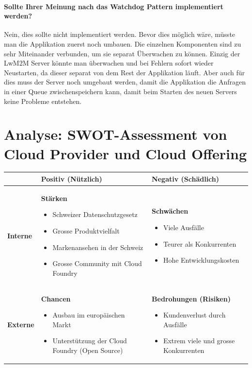 \subsubsection{Sollte Ihrer Meinung nach das Watchdog Pattern implementiert werden?}
Nein, dies sollte nicht implementiert werden. Bevor dies möglich wäre, müsste man die Applikation zuerst noch umbauen. Die einzelnen Komponenten sind zu sehr Miteinander verbunden, um sie separat Überwachen zu können. Einzig der LwM2M Server könnte man überwachen und bei Fehlern sofort wieder Neustarten, da dieser separat von dem Rest der Applikation läuft. Aber auch für dies muss der Server noch umgebaut werden, damit die Applikation die Anfragen in einer Queue zwischenspeichern kann, damit beim Starten des neuen Servers keine Probleme entstehen.
\chapter{Analyse: SWOT-Assessment von Cloud Provider und Cloud Offering}
\begin{table}[H]
\begin{tabular}{|l|p{}|p{}|}
\hline 
 & \textbf{Positiv (Nützlich)}  & \textbf{Negativ (Schädlich)} \\ \hline 
\textbf{Interne} & \textbf{Stärken} 
\begin{itemize}
\item Schweizer Datenschutzgesetz
\item Grosse Produktvielfalt
\item Markenansehen in der Schweiz
\item Grosse Community mit Cloud Foundry
\end{itemize}

& \textbf{Schwächen}
\begin{itemize}
\item Viele Ausfälle
\item Teurer als Konkurrenten
\item Hohe Entwicklungskosten
\end{itemize}
\\ \hline 
\textbf{Externe} & \textbf{Chancen} 
\begin{itemize}
\item Ausbau im europäischen Markt
\item Unterstützung der Cloud Foundry (Open Source)
\end{itemize}&
\textbf{Bedrohungen (Risiken)} 
 \begin{itemize}
\item Kundenverlust durch Ausfälle
\item Extrem viele und grosse Konkurrenten
\end{itemize}
\\ \hline 
\end{tabular} 
\end{table}

